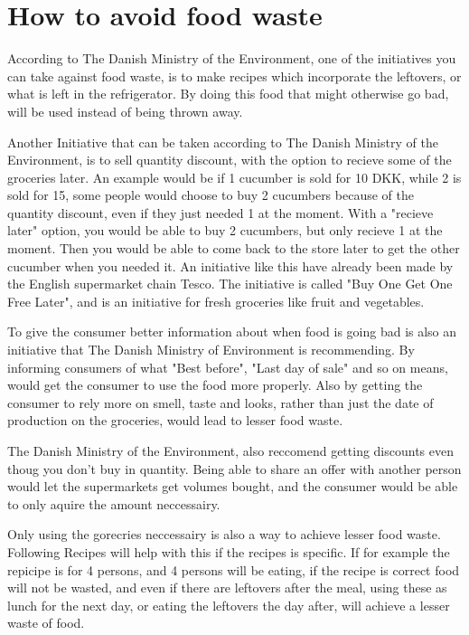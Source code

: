 \section{How to avoid food waste}

According to The Danish Ministry of the Environment, one of the initiatives you can take against food waste, is to make recipes which incorporate the leftovers, or what is left in the refrigerator. By doing this food that might otherwise go bad, will be used instead of being thrown away. %

Another Initiative that can be taken according to The Danish Ministry of the Environment, is to sell quantity discount, with the option to recieve some of the groceries later. An example would be if 1 cucumber is sold for 10 DKK, while 2 is sold for 15, some people would choose to buy 2 cucumbers because of the quantity discount, even if they just needed 1 at the moment. With a "recieve later" option, you would be able to buy 2 cucumbers, but only recieve 1 at the moment. Then you would be able to come back to the store later to get the other cucumber when you needed it. An initiative like this have already been made by the English supermarket chain Tesco. The initiative is called "Buy One Get One Free Later", and is an initiative for fresh groceries like fruit and vegetables.

To give the consumer better information about when food is going bad is also an initiative that The Danish Ministry of Environment is recommending. By informing consumers of what "Best before", "Last day of sale" and so on means, would get the consumer to use the food more properly. Also by getting the consumer to rely more on smell, taste and looks, rather than just the date of production on the groceries, would lead to lesser food waste.

The Danish Ministry of the Environment, also reccomend getting discounts even thoug you don't buy in quantity. Being able to share an offer with another person would let the supermarkets get volumes bought, and the consumer would be able to only aquire the amount neccessairy.

Only using the gorecries neccessairy is also a way to achieve lesser food waste. Following Recipes will help with this if the recipes is specific. If for example the repicipe is for 4 persons, and 4 persons will be eating, if the recipe is correct food will not be wasted, and even if there are leftovers after the meal, using these as lunch for the next day, or eating the leftovers the day after, will achieve a lesser waste of food. %

